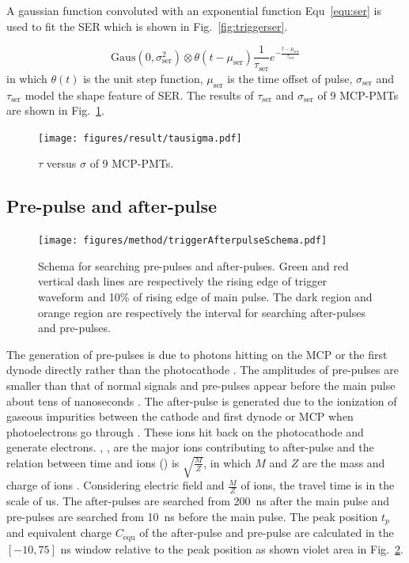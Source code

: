 A gaussian function convoluted with an exponential function Equ~\eqref{equ:ser} is used to fit the SER which is shown in Fig.~\ref{fig:triggerser}.

\begin{equation}
    \label{equ:ser}
    \mathrm{Gaus}(0,\sigma_{\mathrm{ser}}^2)\otimes\theta(t-\mu_{\mathrm{ser}})\frac{1}{\tau_{\mathrm{ser}}}e^{-\frac{t-\mu_{\mathrm{ser}}}{\tau_{\mathrm{ser}}}}
\end{equation}
in which $\theta(t)$ is the unit step function, $\mu_{\mathrm{ser}}$ is the time offset of pulse, $\sigma_{\mathrm{ser}}$ and $\tau_{\mathrm{ser}}$ model the shape feature of SER. The results of $\tau_{\mathrm{ser}}$ and $\sigma_{\mathrm{ser}}$ of 9 MCP-PMTs are shown in Fig.~\ref{fig:sigmaCompare}.
\begin{figure}[!htbp]
    \centering
    \texttt{[image: figures/result/tausigma.pdf]}
    \caption{$\tau$ versus $\sigma$ of 9 MCP-PMTs.}
    \label{fig:sigmaCompare}
\end{figure}


\subsection{Pre-pulse and after-pulse}
\label{sec:afterpulse}
\begin{figure}
    \centering
    \texttt{[image: figures/method/triggerAfterpulseSchema.pdf]}
    \caption{Schema for searching pre-pulses and after-pulses. Green and red vertical dash lines are respectively the rising edge of trigger waveform and 10\% of rising edge of main pulse. The dark region and orange region are respectively the interval for searching after-pulses and pre-pulses.}
    \label{fig:afterpulseSchema}
\end{figure}

The generation of pre-pulses is due to photons hitting on the MCP or the first dynode directly rather than the photocathode \cite{JUNOMassTesting}. The amplitudes of pre-pulses are smaller than that of normal signals and pre-pulses appear before the main pulse about tens of nanoseconds \cite{JUNOMassTesting}. The after-pulse is generated due to the ionization of gaseous impurities between the cathode and first dynode or MCP when photoelectrons go through \cite{Coates_1973}. These ions hit back on the photocathode and generate electrons. , ,  are the major ions contributing to after-pulse and the relation between time and ions () is $\sqrt{\frac{M}{Z}}$, in which $M$ and $Z$ are the mass and charge of ions \cite{Coates_1973,XENON1TTesting}. Considering electric field and $\frac{M}{Z}$ of ions, the travel time is in the scale of \si{us}. The after-pulses are searched from \SI{200}{ns} after the main pulse and pre-pulses are searched from \SI{10}{ns} before the main pulse. The peak position $t_p$ and equivalent charge $C_{\mathrm{equ}}$ of the after-pulse and pre-pulse are calculated in the $[-10,75]$ ns window relative to the peak position as shown violet area in Fig.~\ref{fig:afterpulseSchema}.

